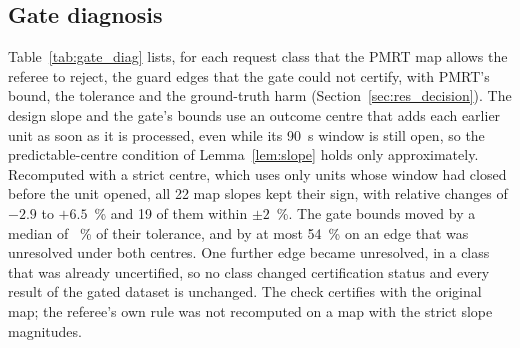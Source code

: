 \subsection{Gate diagnosis}
\label{app:gate}
\label{app:x16}

Table~\ref{tab:gate_diag} lists, for each request class that the PMRT map allows the referee to reject, the guard edges
that the gate could not certify, with PMRT's bound, the tolerance and the ground-truth harm (Section~\ref{sec:res_decision}).
The design slope and the gate's bounds use an outcome centre that adds each earlier unit as soon as it is processed, even
while its 90~s window is still open, so the predictable-centre condition of Lemma~\ref{lem:slope} holds only
approximately. Recomputed with a strict centre, which uses only units whose window had closed before the unit opened,
all 22 map slopes kept their sign, with relative changes of $-2.9$ to $+6.5$~\% and 19 of them within $\pm 2$~\%. The
gate bounds moved by a median of ~\% of their tolerance, and by at most 54~\% on an edge that was unresolved under
both centres. One further edge became unresolved, in a class that was already uncertified, so no class changed
certification status and every result of the gated dataset is unchanged. The check certifies with the original map;
the referee's own rule was not recomputed on a map with the strict slope magnitudes.

